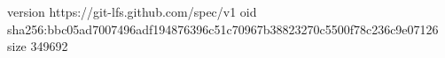 version https://git-lfs.github.com/spec/v1
oid sha256:bbc05ad7007496adf194876396c51c70967b38823270c5500f78c236c9e07126
size 349692
